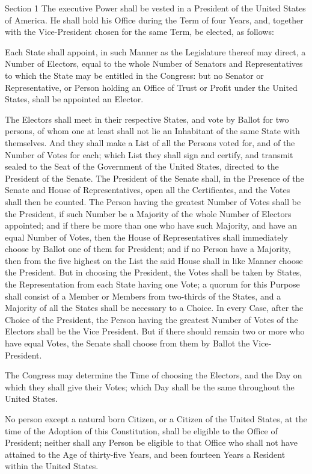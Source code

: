 \documentclass{article}
\begin{document}
Section 1
The executive Power shall be vested in a President of the United States of
America. He shall hold his Office during the Term of four Years, and, together
with the Vice-President chosen for the same Term, be elected, as follows:

Each State shall appoint, in such Manner as the Legislature thereof may direct,
a Number of Electors, equal to the whole Number of Senators and Representatives
to which the State may be entitled in the Congress: but no Senator or
Representative, or Person holding an Office of Trust or Profit under the United
States, shall be appointed an Elector.

The Electors shall meet in their respective States, and vote by Ballot for two
persons, of whom one at least shall not lie an Inhabitant of the same State
with themselves. And they shall make a List of all the Persons voted for, and
of the Number of Votes for each; which List they shall sign and certify, and
transmit sealed to the Seat of the Government of the United States, directed to
the President of the Senate. The President of the Senate shall, in the Presence
of the Senate and House of Representatives, open all the Certificates, and the
Votes shall then be counted. The Person having the greatest Number of Votes
shall be the President, if such Number be a Majority of the whole Number of
Electors appointed; and if there be more than one who have such Majority, and
have an equal Number of Votes, then the House of Representatives shall
immediately choose by Ballot one of them for President; and if no Person have a
Majority, then from the five highest on the List the said House shall in like
Manner choose the President. But in choosing the President, the Votes shall be
taken by States, the Representation from each State having one Vote; a quorum
for this Purpose shall consist of a Member or Members from two-thirds of the
States, and a Majority of all the States shall be necessary to a Choice. In
every Case, after the Choice of the President, the Person having the greatest
Number of Votes of the Electors shall be the Vice President. But if there
should remain two or more who have equal Votes, the Senate shall choose from
them by Ballot the Vice-President.

The Congress may determine the Time of choosing the Electors, and the Day on
which they shall give their Votes; which Day shall be the same throughout the
United States.

No person except a natural born Citizen, or a Citizen of the United States, at
the time of the Adoption of this Constitution, shall be eligible to the Office
of President; neither shall any Person be eligible to that Office who shall not
have attained to the Age of thirty-five Years, and been fourteen Years a
Resident within the United States.
\end{document}

